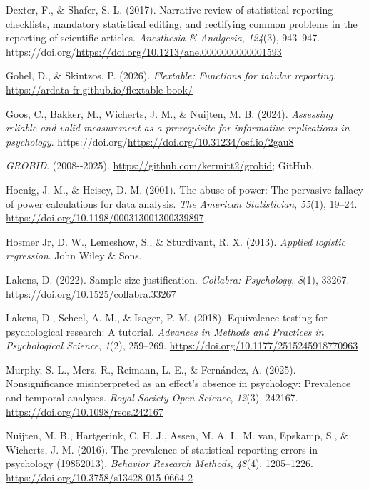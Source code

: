 \documentclass[
  letterpaper,
  12pt]{article}
\newlength{\cslhangindent}
\newenvironment{CSLReferences}[2] %
 {\begin{list}{}{%
  \setlength{\itemindent}{0pt}
  \setlength{\leftmargin}{0pt}
  \setlength{\parsep}{0pt}
  \ifodd #1
   \setlength{\leftmargin}{\cslhangindent}
   \setlength{\itemindent}{-1\cslhangindent}
  \fi
  \setlength{\itemsep}{#2\baselineskip}}}
 {\end{list}}
\begin{document}
\begin{CSLReferences}{1}{0}
Dexter, F., \& Shafer, S. L. (2017). Narrative review of statistical
reporting checklists, mandatory statistical editing, and rectifying
common problems in the reporting of scientific articles.
\emph{Anesthesia \& Analgesia}, \emph{124}(3), 943--947.
https://doi.org/\url{https://doi.org/10.1213/ane.0000000000001593}

Gohel, D., \& Skintzos, P. (2026). \emph{Flextable: Functions for
tabular reporting}. \url{https://ardata-fr.github.io/flextable-book/}

Goos, C., Bakker, M., Wicherts, J. M., \& Nuijten, M. B. (2024).
\emph{Assessing reliable and valid measurement as a prerequisite for
informative replications in psychology}.
https://doi.org/\url{https://doi.org/10.31234/osf.io/2gau8}

\emph{GROBID}. (2008-\/-2025). \url{https://github.com/kermitt2/grobid};
GitHub.

Hoenig, J. M., \& Heisey, D. M. (2001). The abuse of power: The
pervasive fallacy of power calculations for data analysis. \emph{The
American Statistician}, \emph{55}(1), 19--24.
\url{https://doi.org/10.1198/000313001300339897}

Hosmer Jr, D. W., Lemeshow, S., \& Sturdivant, R. X. (2013).
\emph{Applied logistic regression}. John Wiley \& Sons.

Lakens, D. (2022). Sample size justification. \emph{Collabra:
Psychology}, \emph{8}(1), 33267.
\url{https://doi.org/10.1525/collabra.33267}

Lakens, D., Scheel, A. M., \& Isager, P. M. (2018). Equivalence testing
for psychological research: A tutorial. \emph{Advances in Methods and
Practices in Psychological Science}, \emph{1}(2), 259--269.
\url{https://doi.org/10.1177/2515245918770963}

Murphy, S. L., Merz, R., Reimann, L.-E., \& Fernández, A. (2025).
Nonsignificance misinterpreted as an effect's absence in psychology:
Prevalence and temporal analyses. \emph{Royal Society Open Science},
\emph{12}(3), 242167. \url{https://doi.org/10.1098/rsos.242167}

Nuijten, M. B., Hartgerink, C. H. J., Assen, M. A. L. M. van, Epskamp,
S., \& Wicherts, J. M. (2016). The prevalence of statistical reporting
errors in psychology (1985{\textendash}2013). \emph{Behavior Research
Methods}, \emph{48}(4), 1205--1226.
\url{https://doi.org/10.3758/s13428-015-0664-2}


\end{CSLReferences}
\end{document}
